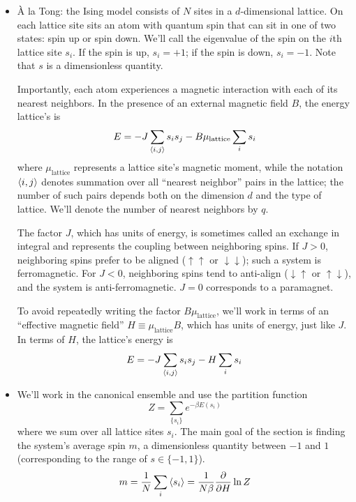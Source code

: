 \documentclass[11pt, a4paper]{article}
\begin{document}
\begin{itemize}
	\item \`{A} la Tong: the Ising model consists of $ N $ sites in a $ d $-dimensional lattice. On each lattice site sits an atom with quantum spin that can sit in one of two states: spin up or spin down. We’ll call the eigenvalue of the spin on the $ i $th lattice site $ s_{i} $. If the spin is up, $ s_{i} = +1 $; if the spin is down, $ s_{i} = -1 $. Note that $ s $ is a dimensionless quantity. 
	
	Importantly, each atom experiences a magnetic interaction with each of its nearest neighbors. In the presence of an external magnetic field $ B $, the energy lattice's is
	\begin{equation*}
		E = - J\sum_{\expval{i, j}}s_{i}s_{j} - B \mu_{\text{lattice}} \sum_{i}s_{i}
	\end{equation*}
	where $ \mu_{\text{lattice}} $ represents a lattice site's magnetic moment, while the notation $ \expval{i, j} $ denotes summation over all “nearest neighbor” pairs in the lattice; the number of such pairs depends both on the dimension $ d $ and the type of lattice. We'll denote the number of nearest neighbors by $ q $. 
	
	The factor $ J $, which has units of energy, is sometimes called an exchange in integral and represents the coupling between neighboring spins. If $ J > 0 $, neighboring spins prefer to be aligned ($ \uparrow \uparrow  $ or $ \downarrow \downarrow $); such a system is ferromagnetic. For $ J < 0 $, neighboring spins tend to anti-align ($ \downarrow\uparrow  $ or $  \uparrow \downarrow $), and the system is anti-ferromagnetic. $ J = 0 $ corresponds to a paramagnet.
	
	To avoid repeatedly writing the factor $ B \mu_{\text{lattice}} $, we'll work in terms of an ``effective magnetic field'' $ H \equiv \mu_{\text{lattice}} B $, which has units of energy, just like $ J $. In terms of $ H $, the lattice's energy is
	\begin{equation*}
		E = - J\sum_{\expval{i, j}}s_{i}s_{j} - H \sum_{i}s_{i}
	\end{equation*}	

	\item We'll work in the canonical ensemble and use the partition function
	\begin{equation*}
		Z = \sum_{\{s_{i}\} }e^{-\beta E(s_{i})} 
	\end{equation*}
	where we sum over all lattice sites $ s_{i} $. The main goal of the section is finding the system's average spin $ m $, a dimensionless quantity between $ -1 $ and $ 1 $ (corresponding to the range of $ s \in \{-1, 1\} $).
	\begin{equation*}
		m = \frac{1}{N} \sum_{i} \expval{s_{i}} = \frac{1}{N \beta} \pdv{}{H} \ln Z
	\end{equation*}
	

\end{itemize}
\end{document}
